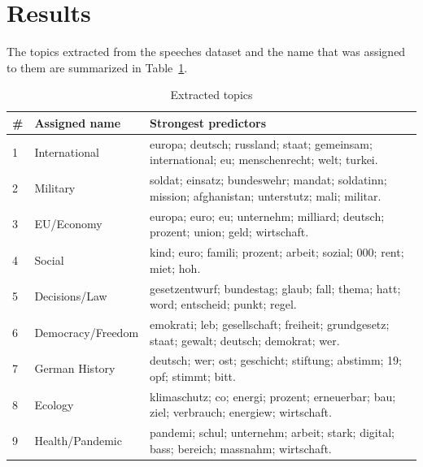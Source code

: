 \documentclass{article}
\begin{document}
\section{Results}
The topics extracted from the speeches dataset and the name that was assigned to them are summarized in Table~\ref{topics_table}.
\begin{table}
  \captionsetup{width=0.9\linewidth}
  \caption{Extracted topics}
  \label{topics_table}
  \centering
  \begin{tabular}{p{0.02\linewidth} | p{0.2\linewidth} | p{0.78\linewidth}}
    \toprule
    \# & Assigned name & Strongest predictors \\
    \midrule
    1 & International & europa; deutsch; russland; staat; gemeinsam; international; eu; menschenrecht; welt; turkei. \\
    2 & Military & soldat; einsatz; bundeswehr; mandat; soldatinn; mission; afghanistan; unterstutz; mali; militar. \\
    3 & EU/Economy & europa; euro; eu; unternehm; milliard; deutsch; prozent; union; geld; wirtschaft. \\
    4 & Social & kind; euro; famili; prozent; arbeit; sozial; 000; rent; miet; hoh. \\
    5 & Decisions/Law & gesetzentwurf; bundestag; glaub; fall; thema; hatt; word; entscheid; punkt; regel. \\
    6 & Democracy/Freedom & emokrati; leb; gesellschaft; freiheit; grundgesetz; staat; gewalt; deutsch; demokrat; wer. \\
    7 & German History & deutsch; wer; ost; geschicht; stiftung; abstimm; 19; opf; stimmt; bitt. \\
    8 & Ecology & klimaschutz; co; energi; prozent; erneuerbar; bau; ziel; verbrauch; energiew; wirtschaft. \\
    9 & Health/Pandemic & pandemi; schul; unternehm; arbeit; stark; digital; bass; bereich; massnahm; wirtschaft. \\
    \bottomrule
  \end{tabular}
\end{table}
\end{document}
